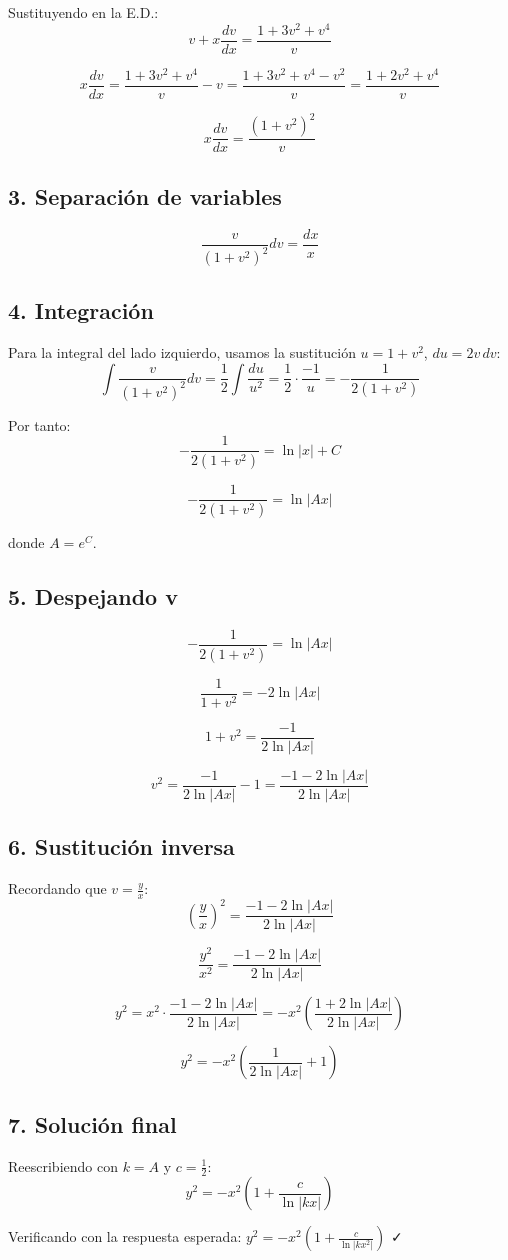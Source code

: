 \documentclass[a4paper,12pt]{article}
\begin{document}
Sustituyendo en la E.D.:
\[
v + x\frac{dv}{dx} = \frac{1 + 3v^2 + v^4}{v}
\]

\[
x\frac{dv}{dx} = \frac{1 + 3v^2 + v^4}{v} - v = \frac{1 + 3v^2 + v^4 - v^2}{v} = \frac{1 + 2v^2 + v^4}{v}
\]

\[
x\frac{dv}{dx} = \frac{(1 + v^2)^2}{v}
\]

\subsection*{3. Separación de variables}
\[
\frac{v}{(1 + v^2)^2} dv = \frac{dx}{x}
\]

\subsection*{4. Integración}
Para la integral del lado izquierdo, usamos la sustitución $u = 1 + v^2$, $du = 2v\,dv$:
\[
\int \frac{v}{(1 + v^2)^2} dv = \frac{1}{2}\int \frac{du}{u^2} = \frac{1}{2} \cdot \frac{-1}{u} = -\frac{1}{2(1 + v^2)}
\]

Por tanto:
\[
-\frac{1}{2(1 + v^2)} = \ln|x| + C
\]

\[
-\frac{1}{2(1 + v^2)} = \ln|Ax|
\]

donde $A = e^C$.

\subsection*{5. Despejando v}
\[
-\frac{1}{2(1 + v^2)} = \ln|Ax|
\]

\[
\frac{1}{1 + v^2} = -2\ln|Ax|
\]

\[
1 + v^2 = \frac{-1}{2\ln|Ax|}
\]

\[
v^2 = \frac{-1}{2\ln|Ax|} - 1 = \frac{-1 - 2\ln|Ax|}{2\ln|Ax|}
\]

\subsection*{6. Sustitución inversa}
Recordando que $v = \frac{y}{x}$:
\[
\left(\frac{y}{x}\right)^2 = \frac{-1 - 2\ln|Ax|}{2\ln|Ax|}
\]

\[
\frac{y^2}{x^2} = \frac{-1 - 2\ln|Ax|}{2\ln|Ax|}
\]

\[
y^2 = x^2 \cdot \frac{-1 - 2\ln|Ax|}{2\ln|Ax|} = -x^2\left(\frac{1 + 2\ln|Ax|}{2\ln|Ax|}\right)
\]

\[
y^2 = -x^2\left(\frac{1}{2\ln|Ax|} + 1\right)
\]

\subsection*{7. Solución final}
Reescribiendo con $k = A$ y $c = \frac{1}{2}$:
\[
\boxed{y^2 = -x^2\left(1 + \frac{c}{\ln|kx|}\right)}
\]

Verificando con la respuesta esperada: $y^2 = -x^2\left(1 + \frac{c}{\ln|kx^2|}\right)$ ✓
\end{document}
